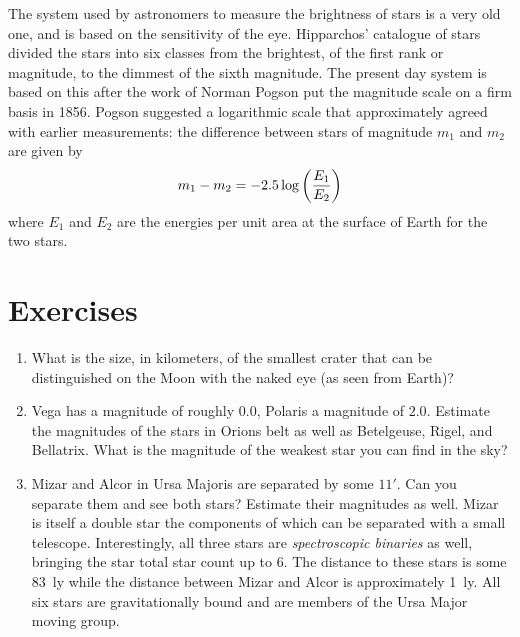The system used by astronomers to measure the brightness of stars is a
very old one, and is based on the sensitivity of the eye. Hipparchos'
catalogue of stars divided the stars into six classes from the
brightest, of the first rank or magnitude, to the dimmest of the sixth
magnitude. The present day system is based on this after the work of
Norman Pogson put the magnitude scale on a firm basis in 1856. Pogson
suggested a logarithmic scale that approximately agreed with earlier
measurements: the difference between stars of magnitude $m_1$ and
$m_2$ are given by 
\[
m_1-m_2=-2.5\log\left({E_1\over E_2}\right)
\]
where $E_1$ and $E_2$ are the energies per unit area at the surface of
Earth for the two stars.

\section{Exercises}

\begin{enumerate}
\item What is the size, in kilometers, of the smallest crater that can be distinguished on 
the Moon with the naked eye (as seen from Earth)?
\item Vega has a magnitude of roughly $0.0$, Polaris a magnitude of $2.0$. 
Estimate the magnitudes of the stars in Orions belt as well as Betelgeuse,
Rigel, and Bellatrix. What is the magnitude of the weakest star you can find
in the sky? 
\item Mizar and Alcor in Ursa Majoris are separated by some $11'$.
 Can you separate them and see both stars? Estimate their magnitudes
 as well. Mizar is itself a double star the components of which can be
 separated with a small telescope. Interestingly, all three stars are
 {\it spectroscopic binaries} as well, bringing the star total star
 count up to 6. The distance to these stars is some 83~ly while the
 distance between Mizar and Alcor is approximately
 1~ly. All six stars are  gravitationally bound and are
 members of the Ursa Major moving group.
\end{enumerate}

%
